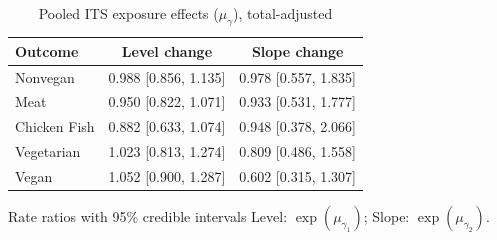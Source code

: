 \begin{table}[H]
\centering
\caption{Pooled ITS exposure effects ($\mu_\gamma$), total-adjusted}
\label{tab:a3_mu_gamma_adj}
\begin{tabular}{lcc}
\toprule
Outcome & Level change & Slope change \\
\midrule
Nonvegan & 0.988 [0.856, 1.135] & 0.978 [0.557, 1.835] \\
Meat & 0.950 [0.822, 1.071] & 0.933 [0.531, 1.777] \\
Chicken Fish & 0.882 [0.633, 1.074] & 0.948 [0.378, 2.066] \\
Vegetarian & 1.023 [0.813, 1.274] & 0.809 [0.486, 1.558] \\
Vegan & 1.052 [0.900, 1.287] & 0.602 [0.315, 1.307] \\
\bottomrule
\end{tabular}
\par\smallskip\footnotesize Rate ratios with 95\% credible intervals Level: $\exp(\mu_{\gamma_1})$; Slope: $\exp(\mu_{\gamma_2})$.
\end{table}
